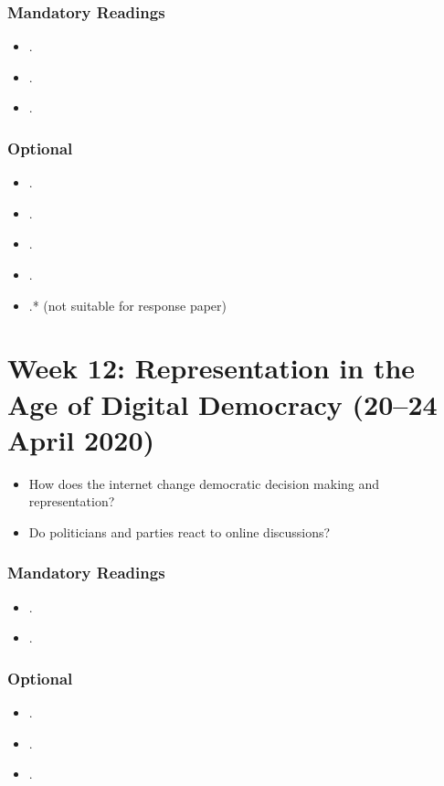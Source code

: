 \documentclass[abstract=on,parskip=full,headings=standardclasses,fontsize=11pt,paper=a4]{scrartcl}
\begin{document}
\subsubsection*{Mandatory Readings}
\begin{itemize}
\item {}.
\item {}.
\item {}.
\end{itemize}


\subsubsection*{Optional}
\begin{itemize}
\item {}.
\item {}.
\item {}.
\item {}.
\item {}.* (not suitable for response paper)
\end{itemize}



\section{Week 12: Representation in the Age of Digital Democracy (20--24 April 2020)}


\begin{itemize}
\renewcommand\labelitemi{--}
\item How does the internet change democratic decision making and representation?
\item Do politicians and parties react to online discussions?
\end{itemize}

\subsubsection*{Mandatory Readings}
\begin{itemize}
\item {}.
\item {}.
\end{itemize}


\subsubsection*{Optional}
\begin{itemize}
\item {}.
\item {}.
\item {}.
\end{itemize}


\end{document}
